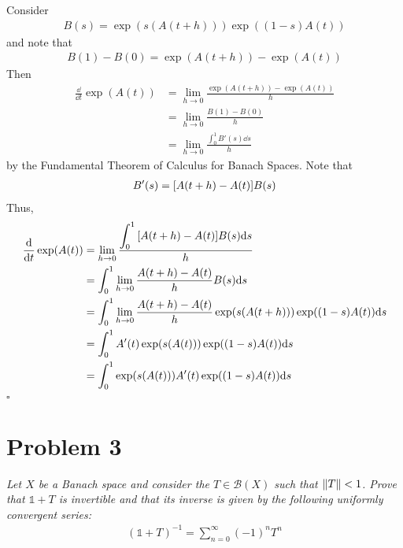\documentclass[12pt]{article}
\theoremstyle{plain}
\begin{document}
Consider
\begin{align*}
    B(s) = \exp(s(A(t+h)))\exp((1-s)A(t))
\end{align*}
and note that
\begin{align*}
    B(1) - B(0) = \exp(A(t+h)) - \exp(A(t))
\end{align*}
Then
\begin{align*}
    \frac{\dd}{\dd t}\exp(A(t)) &= \lim_{h\rightarrow 0}\frac{\exp(A(t+h)) - \exp(A(t))}{h} \\
    &= \lim_{h\rightarrow 0}\frac{B(1) - B(0)}{h} \\
    &= \lim_{h\rightarrow 0}\frac{\displaystyle\int_0^1 B'(s)\dd s}{h}
\end{align*}
by the Fundamental Theorem of Calculus for Banach Spaces.  Note that
\begin{align*}
    B'(s) = \qty[A(t+h) - A(t)]B(s)
\end{align*}
Thus,
\begin{align*}
    \frac{\dd}{\dd t}\exp(A(t)) &= \lim_{h\rightarrow 0}\frac{\displaystyle\int_0^1 \qty[A(t+h) - A(t)]B(s)\dd s}{h} \\
    &= \int_0^1 \lim_{h\rightarrow 0}\frac{A(t+h) - A(t)}{h} B(s)\dd s \\
    &= \int_0^1 \lim_{h\rightarrow 0}\frac{A(t+h) - A(t)}{h} \exp(s(A(t+h)))\exp((1-s)A(t)) \dd s \\
    &= \int_0^1 A'(t) \exp(s(A(t)))\exp((1-s)A(t)) \dd s \\
    &= \int_0^1\exp(s(A(t)))A'(t)\exp((1-s)A(t)) \dd s
\end{align*} 
\hfill $\square$

\section*{Problem 3}
\emph{Let $X$ be a Banach space and consider the $T \in \mathcal{B}(X)$ such that $\norm{T} < 1$.  Prove that $\mathbb{1} + T$ is invertible and that its inverse is given by the following uniformly convergent series:}
\begin{align*}
    (\mathbb{1} + T)^{-1} = \sum_{n=0}^\infty (-1)^n T^n
\end{align*}
\end{document}
